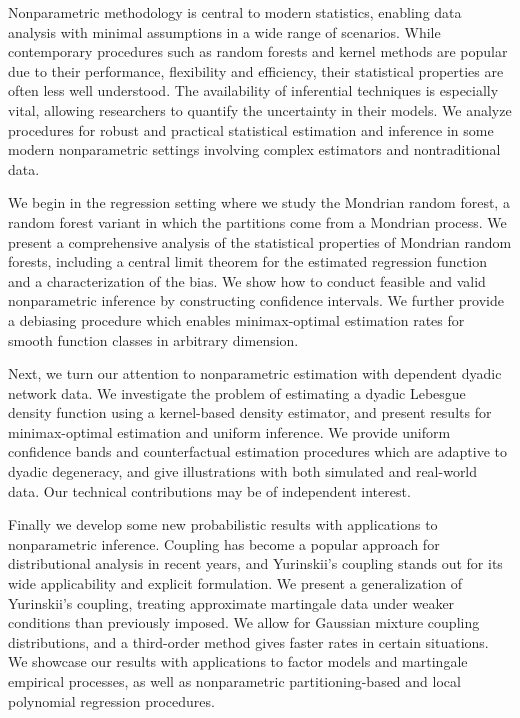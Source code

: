 

Nonparametric methodology is central to modern statistics, enabling
data analysis with minimal assumptions in a wide range of scenarios.
While contemporary procedures such as random forests and kernel
methods are popular due to their performance, flexibility and efficiency, their
statistical properties are often less well understood.
The availability of inferential techniques is especially vital,
allowing researchers to quantify the uncertainty in their models.
We analyze procedures for robust and practical statistical estimation and
inference in some modern nonparametric settings involving complex estimators
and nontraditional data.

We begin in the regression setting where we study the Mondrian random forest, a
random forest variant in which the partitions come from a Mondrian process. We
present a comprehensive analysis of the statistical properties of Mondrian
random forests, including a central limit theorem for the estimated regression
function and a characterization of the bias. We show how to conduct feasible
and valid nonparametric inference by constructing confidence intervals. We
further provide a debiasing procedure which enables minimax-optimal estimation
rates for smooth function classes in arbitrary dimension.

Next, we turn our attention to nonparametric estimation with dependent dyadic
network data. We investigate the problem of estimating a dyadic Lebesgue
density function using a kernel-based density estimator, and present results
for minimax-optimal estimation and uniform inference. We provide uniform
confidence bands and counterfactual estimation procedures which are adaptive to
dyadic degeneracy, and give illustrations with both simulated and real-world
data. Our technical contributions may be of independent interest.

Finally we develop some new probabilistic results with applications to
nonparametric inference. Coupling has become a popular approach for
distributional analysis in recent years, and Yurinskii's coupling stands out
for its wide applicability and explicit formulation. We present a
generalization of Yurinskii's coupling, treating approximate martingale data
under weaker conditions than previously imposed. We allow for Gaussian mixture
coupling distributions, and a third-order method gives faster rates in certain
situations. We showcase our results with applications to factor models and
martingale empirical processes, as well as nonparametric partitioning-based and
local polynomial regression procedures.
